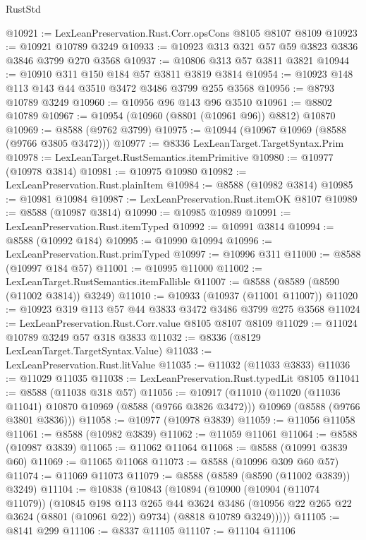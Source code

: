 \begin{lexlean}{RustStd}
\begin{coremodule}
@10921 := LexLeanPreservation.Rust.Corr.opsCons @8105 @8107 @8109
@10923 := @10921 @10789 @3249
@10933 := @10923 @313 @321 @57 @59 @3823 @3836 @3846 @3799 @270 @3568
@10937 := @10806 @313 @57 @3811 @3821
@10944 := @10910 @311 @150 @184 @57 @3811 @3819 @3814
@10954 := @10923 @148 @113 @143 @44 @3510 @3472 @3486 @3799 @255 @3568
@10956 := @8793 @10789 @3249
@10960 := @10956 @96 @143 @96 @3510
@10961 := @8802 @10789
@10967 := @10954 (@10960 (@8801 (@10961 @96)) @8812) @10870
@10969 := @8588 (@9762 @3799)
@10975 := @10944 (@10967 @10969 (@8588 (@9766 @3805 @3472)))
@10977 := @8336 LexLeanTarget.TargetSyntax.Prim
@10978 := LexLeanTarget.RustSemantics.itemPrimitive
@10980 := @10977 (@10978 @3814)
@10981 := @10975 @10980
@10982 := LexLeanPreservation.Rust.plainItem
@10984 := @8588 (@10982 @3814)
@10985 := @10981 @10984
@10987 := LexLeanPreservation.Rust.itemOK @8107
@10989 := @8588 (@10987 @3814)
@10990 := @10985 @10989
@10991 := LexLeanPreservation.Rust.itemTyped
@10992 := @10991 @3814
@10994 := @8588 (@10992 @184)
@10995 := @10990 @10994
@10996 := LexLeanPreservation.Rust.primTyped
@10997 := @10996 @311
@11000 := @8588 (@10997 @184 @57)
@11001 := @10995 @11000
@11002 := LexLeanTarget.RustSemantics.itemFallible
@11007 := @8588 (@8589 (@8590 (@11002 @3814)) @3249)
@11010 := @10933 (@10937 (@11001 @11007))
@11020 := @10923 @319 @113 @57 @44 @3833 @3472 @3486 @3799 @275 @3568
@11024 := LexLeanPreservation.Rust.Corr.value @8105 @8107 @8109
@11029 := @11024 @10789 @3249 @57 @318 @3833
@11032 := @8336 (@8129 LexLeanTarget.TargetSyntax.Value)
@11033 := LexLeanPreservation.Rust.litValue
@11035 := @11032 (@11033 @3833)
@11036 := @11029 @11035
@11038 := LexLeanPreservation.Rust.typedLit @8105
@11041 := @8588 (@11038 @318 @57)
@11056 := @10917
    (@11010
      (@11020 (@11036 @11041) @10870 @10969 (@8588 (@9766 @3826 @3472)))
      @10969
      (@8588 (@9766 @3801 @3836)))
@11058 := @10977 (@10978 @3839)
@11059 := @11056 @11058
@11061 := @8588 (@10982 @3839)
@11062 := @11059 @11061
@11064 := @8588 (@10987 @3839)
@11065 := @11062 @11064
@11068 := @8588 (@10991 @3839 @60)
@11069 := @11065 @11068
@11073 := @8588 (@10996 @309 @60 @57)
@11074 := @11069 @11073
@11079 := @8588 (@8589 (@8590 (@11002 @3839)) @3249)
@11104 := @10838
    (@10843
      (@10894
        (@10900
          (@10904 (@11074 @11079))
          (@10845
            @198
            @113
            @265
            @44
            @3624
            @3486
            (@10956 @22 @265 @22 @3624 (@8801 (@10961 @22)) @9734)
            (@8818 @10789 @3249)))))
@11105 := @8141 @299
@11106 := @8337 @11105
@11107 := @11104 @11106

\end{coremodule}
\end{lexlean}
